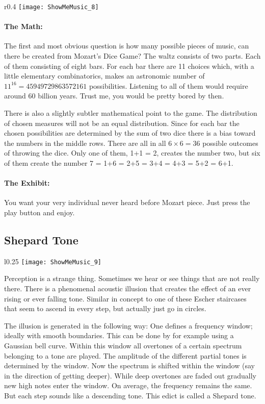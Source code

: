 \begin{wrapfigure}[22]{r}{0.4\textwidth}
\centering
\texttt{[image: ShowMeMusic\_8]}
\end{wrapfigure}

\paragraph{The Math:} The first and most obvious question is how many possible pieces of music, can there be created from Mozart's Dice Game? The waltz consists of two parts. Each of them consisting of eight bars. For each bar there are 11 choices which, with a little elementary combinatorics, makes an astronomic number of $11^{16} = 45 949 729 863 572 161$ possibilities. Listening to all of them would require around 60 billion years. Trust me, you would be pretty bored by then.

There is also a slightly subtler mathematical point to the game. The distribution of chosen measures will not be an equal distribution. Since for each bar the chosen possibilities are determined by the sum of two dice there is a bias toward the numbers in the middle rows. There are all in all $6\times 6=36$ possible outcomes of throwing the dice. Only one of them, 1+1 = 2, creates the number two, but six of them create the number 7 = 1+6 = 2+5 = 3+4 = 4+3 = 5+2 = 6+1.

\paragraph{The Exhibit:} You want your very individual never heard before Mozart piece. Just press the play button and enjoy.

\subsection{Shepard Tone}

\begin{wrapfigure}[39]{l}{0.25\textwidth}
\centering
\texttt{[image: ShowMeMusic\_9]}
\end{wrapfigure}
Perception is a strange thing. Sometimes we hear or see things that are not really there. There is a phenomenal acoustic illusion that creates the effect of an ever rising or ever falling tone. Similar in concept to one of these Escher staircases that seem to ascend in every step, but actually just go in circles.

The illusion is generated in the following way: One defines a frequency window; ideally with smooth boundaries. This can be done by for example using a Gaussian bell curve. Within this window all overtones of a certain spectrum belonging to a tone are played. The amplitude of the different partial tones is determined by the window. Now the spectrum is shifted within the window (say in the direction of getting deeper). While deep overtones are faded out gradually new high notes enter the window. On average, the frequency remains the same. But each step sounds like a descending tone. This edict is called a Shepard tone.




